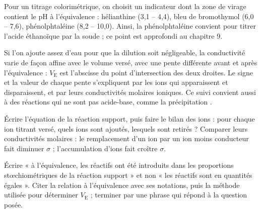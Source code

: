 \begin{savoirfaire}
Pour un titrage colorimétrique, on choisit un indicateur dont la zone de virage contient le pH à l'équivalence :
hélianthine (3,1 -- 4,4), bleu de bromothymol (6,0 -- 7,6), phénolphtaléine (8,2 -- 10,0).
Ainsi, la phénolphtaléine convient pour titrer l'acide éthanoïque par la soude ; ce point est approfondi au chapitre 9.
\end{savoirfaire}
\begin{propriete}
Si l'on ajoute assez d'eau pour que la dilution soit négligeable, la conductivité varie de façon affine avec le
volume versé, avec une pente différente avant et après l'équivalence : $V_\mathrm{E}$ est l'abscisse du point
d'intersection des deux droites. Le signe et la valeur de chaque pente s'expliquent par les ions qui apparaissent
et disparaissent, et par leurs conductivités molaires ioniques. Ce suivi convient aussi à des réactions qui ne sont
pas acide-base, comme la précipitation .
\end{propriete}
\begin{savoirfaire}
Écrire l'équation de la réaction support, puis faire le bilan des ions : pour chaque ion titrant versé, quels ions
sont ajoutés, lesquels sont retirés ? Comparer leurs conductivités molaires : le remplacement d'un ion par un ion
moins conducteur fait diminuer $\sigma$ ; l'accumulation d'ions fait croître $\sigma$.
\end{savoirfaire}
\begin{rediger}
Écrire « à l'équivalence, les réactifs ont été introduits dans les proportions stœchiométriques de la réaction
support » et non « les réactifs sont en quantités égales ». Citer la relation à l'équivalence avec ses notations,
puis la méthode utilisée pour déterminer $V_\mathrm{E}$ ; terminer par une phrase qui répond à la question posée.
\end{rediger}
\exercices

